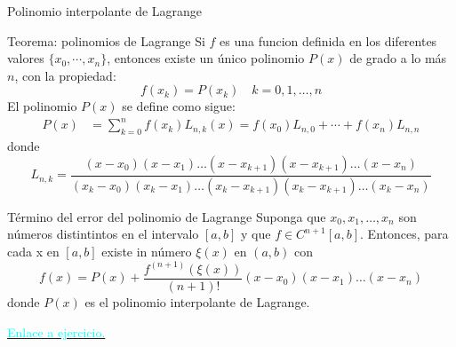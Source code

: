 \label{RetornoPolinomioLagrange}
\begin{frame}{Polinomio interpolante de Lagrange}
\begin{block}{Teorema: polinomios de Lagrange}
\indent Si $f$ es una funcion definida en los diferentes valores $\{x_0,\cdots, x_n\}$, entonces existe un único polinomio $P(x)$ de grado a lo más $n$, con la propiedad:
$$f(x_k)=P(x_k)\quad k=0, 1, \dots, n$$
El polinomio $P(x)$ se define como sigue:
\begin{align*}
P(x)&=\sum_{k=0}^{n}f(x_k)L_{n,k}(x)=f(x_0)L_{n,0}+\cdots+f(x_n)L_{n,n}
\end{align*}
donde
$$L_{n,k}=\frac{(x-x_0)(x-x_1)\dots(x-x_{k+1})(x-x_{k+1})\dots (x-x_n)}{(x_k-x_0)(x_k-x_1)\dots(x_k-x_{k+1})(x_k-x_{k+1})\dots (x_k-x_n)}$$
\end{block}
\end{frame}
\begin{frame}
\begin{block}{Término del error del polinomio de Lagrange}
Suponga que $x_0, x_1, \dots, x_n$ son números distintintos en el intervalo $[a,b]$ y que $f \in C^{n+1}[a,b]$. Entonces, para cada x en $[a,b]$ existe in número $\xi(x)$ en $(a,b)$ con 
$$f(x)=P(x)+\frac{f^{(n+1)}(\xi(x))}{(n+1)!}(x-x_0)(x-x_1)\dots (x-x_n)$$
donde $P(x)$ es el polinomio interpolante de Lagrange.
\end{block}
\hyperlink{PolinomioLagrange}{\textcolor{cyan}{Enlace a ejercicio.}}
\end{frame}
